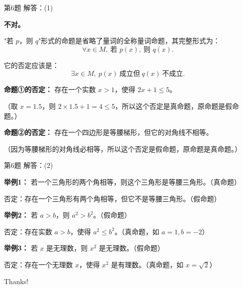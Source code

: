 \documentclass[10pt,aspectratio=169,serif]{beamer}
\begin{document}
\begin{frame}[t]{第6题 解答：(1)}
\begin{tcolorbox}[colback=orange!10,colframe=orange,title=\textbf{解：(1)}]
\textbf{不对。}

\vspace{0.5em}
"若 $p$，则 $q$"形式的命题是省略了量词的全称量词命题，其完整形式为：
\[
\forall x \in M,\ \text{若 } p(x),\ \text{则 } q(x).
\]

它的否定应该是：
\[
\exists x \in M,\ p(x)\ \text{成立但}\ q(x)\ \text{不成立}.
\]

\vspace{0.8em}
\textbf{命题①的否定：}
存在一个实数 $x > 1$，使得 $2x + 1 \le 5$。

\vspace{0.3em}
\small（取 $x = 1.5$，则 $2 \times 1.5 + 1 = 4 \le 5$，所以这个否定是真命题，原命题是假命题。）

\vspace{0.8em}
\textbf{命题②的否定：}
存在一个四边形是等腰梯形，但它的对角线不相等。

\vspace{0.3em}
\small（因为等腰梯形的对角线必相等，所以这个否定是假命题，原命题是真命题。）
\end{tcolorbox}
\end{frame}

\begin{frame}[t]{第6题 解答：(2)}
\begin{tcolorbox}[colback=orange!10,colframe=orange,title=\textbf{解：(2)}]
\textbf{举例1：} 若一个三角形的两个角相等，则这个三角形是等腰三角形。（真命题）

\vspace{0.3em}
否定：存在一个三角形有两个角相等，但它不是等腰三角形。（假命题）

\vspace{0.8em}
\textbf{举例2：} 若 $a > b$，则 $a^2 > b^2$。（假命题）

\vspace{0.3em}
否定：存在实数 $a > b$，使得 $a^2 \le b^2$。（真命题，如 $a = 1, b = -2$）

\vspace{0.8em}
\textbf{举例3：} 若 $x$ 是无理数，则 $x^2$ 是无理数。（假命题）

\vspace{0.3em}
否定：存在一个无理数 $x$，使得 $x^2$ 是有理数。（真命题，如 $x = \sqrt{2}$）
\end{tcolorbox}
\end{frame}

\begin{frame}[c]
  \begin{center}
    {\Huge\calligra Thanks!}
  \end{center}
\end{frame}
\end{document}
